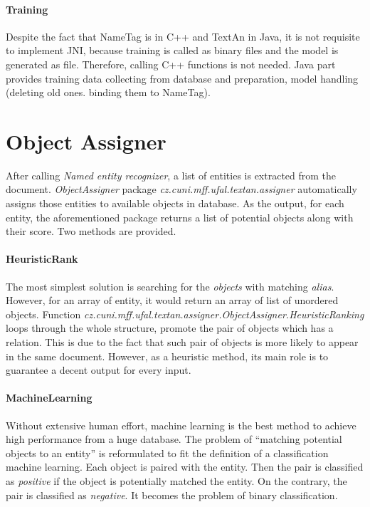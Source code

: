 \paragraph{Training}
Despite the fact that NameTag is in C++ and TextAn in Java, it is not requisite 
to implement JNI, because training is called as binary files and the model is generated
as file. Therefore, calling C++ functions is not needed. Java part provides
training data collecting from database and preparation, model handling
(deleting old ones. binding them to NameTag).

\section{Object Assigner}
\label{sec:ObjectAssigner}


After calling \emph{Named entity recognizer}, a list of entities is extracted from the document. \emph{ObjectAssigner}
package \emph{cz.cuni.mff.ufal.textan.assigner} automatically
assigns those entities to available objects in database. As the output, for 
each entity, the aforementioned package returns a list of potential objects along
with their score. Two methods are provided.

\paragraph{HeuristicRank}
The most simplest solution is searching for the \textit{objects} with matching 
\textit{alias}. However, for an array of entity, it would return an array of 
list of unordered objects.
Function \emph{cz.cuni.mff.ufal.textan.assigner.ObjectAssigner.HeuristicRanking}
loops through the whole structure, promote the pair of objects which has a relation. This is due to the fact that such pair of objects is more likely to appear in the same document. However, as a heuristic method, its main role is to guarantee a decent output for every input.


\paragraph{MachineLearning}
Without extensive human effort, machine learning is the best method to achieve
high performance from a huge database. The problem of ``matching potential objects
to an entity'' is reformulated to fit the definition of a classification machine 
learning. Each object is paired with the entity. Then the pair is classified as
\emph{positive} if the object is potentially matched the entity. On the contrary,
the pair is classified as \emph{negative}. It becomes the problem of binary 
classification.

